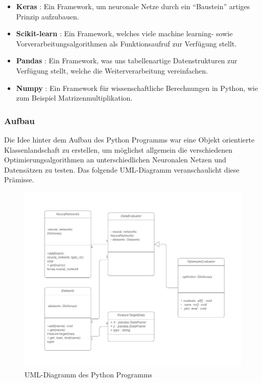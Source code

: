 \begin{itemize}
    \item \textbf{Keras} \cite{chollet2015keras}: Ein Framework, um neuronale Netze durch ein ``Baustein'' artiges 
        Prinzip aufzubauen. 
    \item \textbf{Scikit-learn} \cite{scikit-learn}: Ein Framework, welches viele machine learning-
        sowie Vorverarbeitungsalgorithmen als Funktionsaufruf zur Verfügung stellt.
    \item \textbf{Pandas} \cite{mckinney-proc-scipy-2010}: Ein Framework, was uns 
        tabellenartige Datenstrukturen zur Verfügung stellt, welche die Weiterverarbeitung vereinfachen.
    \item \textbf{Numpy} \cite{numpy}: Ein Framework für wissenschaftliche Berechnungen 
        in Python, wie zum Beispiel Matrizenmultiplikation.  
\end{itemize}

\subsubsection{Aufbau} \label{Aufbau}

Die Idee hinter dem Aufbau des Python Programms war eine Objekt orientierte Klassenlandschaft
zu erstellen, um möglichst allgemein die verschiedenen Optimierungsalgorithmen an unterschiedlichen 
Neuronalen Netzen und Datensätzen zu testen. Das folgende UML-Diagramm veranschaulicht
diese Prämisse.

\begin{figure}[htbp] 
    \centering
       \includegraphics[width=1.0\textwidth]{abb/STI_fertig.png}
    \caption{UML-Diagramm des Python Programms}
    \label{fig:UML}
\end{figure}

